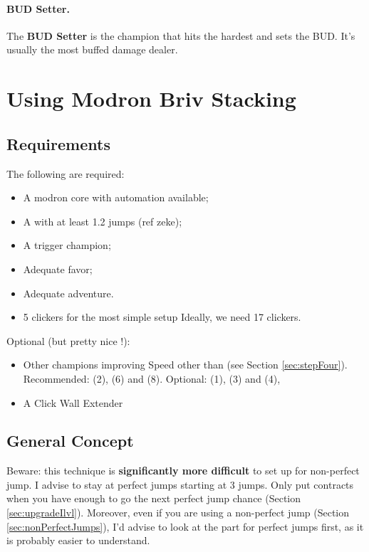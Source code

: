\documentclass{article}
\begin{document}
\paragraph{BUD Setter.}

The \textbf{BUD Setter} is the champion that hits the hardest and sets the BUD.
It's usually the most buffed damage dealer.


\section{Using Modron Briv Stacking}

\subsection{Requirements}

The following are required:
\begin{itemize}
    \item A modron core with automation available;
    \item A \briv with at least 1.2 jumps (ref zeke);
    \item A trigger champion;
    \item Adequate favor;
    \item Adequate adventure.
    \item 5 clickers for the most simple setup Ideally, we need 17 clickers.
\end{itemize}

Optional (but pretty nice !):
\begin{itemize}
    \item Other champions improving Speed other than \briv (see Section \ref{sec:stepFour}).
    Recommended: \widdle (2), \shandie (6) and \hewmaan (8).
    Optional: \deekin (1), \nahara (3) and \sentry (4), 
    \item A Click Wall Extender
\end{itemize}
 


\subsection{General Concept}

Beware: this technique is \textbf{significantly more difficult} to set up for non-perfect jump.
I advise to stay at perfect jumps starting at 3 jumps.
Only put contracts when you have enough to go the next perfect jump chance (Section \ref{sec:upgradeIlvl}).
Moreover, even if you are using a non-perfect jump \briv (Section \ref{sec:nonPerfectJumps}), I'd advise to look at the part for perfect jumps first, as it is probably easier to understand.
\end{document}
